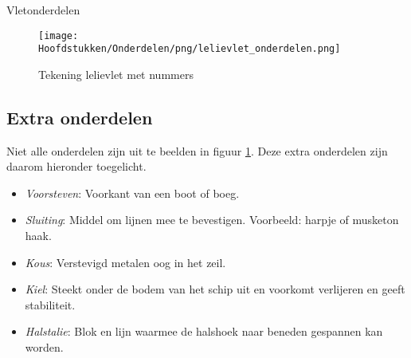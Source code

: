 \begin{table}[h!]
\centering
\caption{Vletonderdelen}

\setlength\extrarowheight{5pt} %
\renewcommand{\arraystretch}{0.75} %
\newcommand{\tabhead}[1]{\cellcolor{ocre}{\color[HTML]{FFFFFF}\sffamily \textbf{#1}}}
\newcommand{\NIL}[1]{\cellcolor{not}{#1}}
\label{table:vletwel}



\setlength\extrarowheight{0pt} %
\renewcommand{\arraystretch}{1} %

\end{table}
\newpage
\begin{figure}[h!]
    \centering
    \texttt{[image: Hoofdstukken/Onderdelen/png/lelievlet\_onderdelen.png]}
    \caption{Tekening lelievlet met nummers \protect\footnotemark}
    \centering
    \label{pic:vlet_nummers}
\end{figure}

\subsection{Extra onderdelen}
\label{ss:extra}
Niet alle onderdelen zijn uit te beelden in figuur \ref{pic:vlet_nummers}. Deze extra onderdelen zijn daarom hieronder toegelicht.
\vspace*{-0.2cm}
\begin{itemize}
	\item \textit{Voorsteven}: Voorkant van een boot of boeg.
	\item \textit{Sluiting}: Middel om lijnen mee te bevestigen. Voorbeeld: harpje of musketon haak.
	\item \textit{Kous}: Verstevigd metalen oog in het zeil.
	\item \textit{Kiel}: Steekt onder de bodem van het schip uit en voorkomt verlijeren en geeft stabiliteit.
	\item \textit{Halstalie}: Blok en lijn waarmee de halshoek naar beneden gespannen kan worden.
\end{itemize}

\newpage

